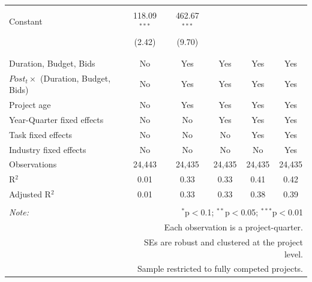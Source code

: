 \documentclass[
]{article}
\begin{document}
\begin{table}[H]
\begin{tabular}{@{\extracolsep{-2pt}}lccccc}
  & & & & & \\ 
 Constant & 118.09$^{***}$ & 462.67$^{***}$ &  &  &  \\ 
  & (2.42) & (9.70) &  &  &  \\ 
  & & & & & \\ 
\hline \\[-1.8ex] 
Duration, Budget, Bids & No & Yes & Yes & Yes & Yes \\ 
$Post_t \times $  (Duration, Budget, Bids) & No & Yes & Yes & Yes & Yes \\ 
Project age & No & Yes & Yes & Yes & Yes \\ 
Year-Quarter fixed effects & No & No & Yes & Yes & Yes \\ 
Task fixed effects & No & No & No & Yes & Yes \\ 
Industry fixed effects & No & No & No & No & Yes \\ 
Observations & 24,443 & 24,435 & 24,435 & 24,435 & 24,435 \\ 
R$^{2}$ & 0.01 & 0.33 & 0.33 & 0.41 & 0.42 \\ 
Adjusted R$^{2}$ & 0.01 & 0.33 & 0.33 & 0.38 & 0.39 \\ 
\hline 
\hline \\[-1.8ex] 
\textit{Note:}  & \multicolumn{5}{r}{$^{*}$p$<$0.1; $^{**}$p$<$0.05; $^{***}$p$<$0.01} \\ 
 & \multicolumn{5}{r}{Each observation is a project-quarter.} \\ 
 & \multicolumn{5}{r}{SEs are robust and clustered at the project level.} \\ 
 & \multicolumn{5}{r}{Sample restricted to fully competed projects.} \\ 
\end{tabular} 
\end{table}
\end{document}
